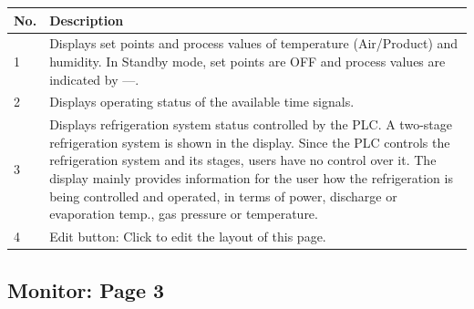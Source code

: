 \begin{longtable}[]{@{}ll@{}}
\toprule
\begin{minipage}[b]{0.07\columnwidth}\raggedright
No.\strut
\end{minipage} & \begin{minipage}[b]{0.88\columnwidth}\raggedright
Description\strut
\end{minipage}\tabularnewline
\midrule
\endhead
\begin{minipage}[t]{0.07\columnwidth}\raggedright
1\strut
\end{minipage} & \begin{minipage}[t]{0.88\columnwidth}\raggedright
Displays set points and process values of temperature (Air/Product) and
humidity. In Standby mode, set points are OFF and process values are
indicated by ---.\strut
\end{minipage}\tabularnewline
\begin{minipage}[t]{0.07\columnwidth}\raggedright
2\strut
\end{minipage} & \begin{minipage}[t]{0.88\columnwidth}\raggedright
Displays operating status of the available time signals.\strut
\end{minipage}\tabularnewline
\begin{minipage}[t]{0.07\columnwidth}\raggedright
3\strut
\end{minipage} & \begin{minipage}[t]{0.88\columnwidth}\raggedright
Displays refrigeration system status controlled by the PLC. A two-stage
refrigeration system is shown in the display. Since the PLC controls the
refrigeration system and its stages, users have no control over it. The
display mainly provides information for the user how the refrigeration
is being controlled and operated, in terms of power, discharge or
evaporation temp., gas pressure or temperature.\strut
\end{minipage}\tabularnewline
\begin{minipage}[t]{0.07\columnwidth}\raggedright
4\strut
\end{minipage} & \begin{minipage}[t]{0.88\columnwidth}\raggedright
Edit button: Click to edit the layout of this page.\strut
\end{minipage}\tabularnewline
\bottomrule
\end{longtable}


\subsection{Monitor: Page 3}

